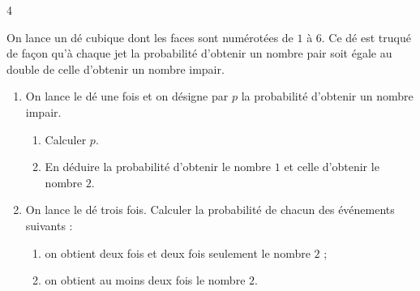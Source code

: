 \documentclass{axiobac}
\begin{document}
\entete

\begin{exercice}{4}

On lance un dé cubique dont les faces sont numérotées de $1$ à $6$. Ce dé est truqué de façon qu'à chaque jet la probabilité d'obtenir un nombre pair soit égale au double de celle d'obtenir un nombre impair.

\begin{enumerate}
    \item On lance le dé une fois et on désigne par $p$ la probabilité d'obtenir un nombre impair.
    \begin{enumerate}
        \item Calculer $p$.
        \item En déduire la probabilité d'obtenir le nombre $1$ et celle d'obtenir le nombre $2$.
    \end{enumerate}
    \item On lance le dé trois fois. Calculer la probabilité de chacun des événements suivants :
    \begin{enumerate}
        \item on obtient deux fois et deux fois seulement le nombre $2$ ;
        \item on obtient au moins deux fois le nombre $2$.
    \end{enumerate}
\end{enumerate}

\end{exercice}
\end{document}
